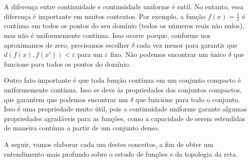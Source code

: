 \documentclass[Analysis/analysis_notes.tex]{subfiles}
\begin{document}
A diferença entre continuidade e continuidade uniforme é sutil. No entanto, essa diferença é importante em muitos contextos.
Por exemplo, a função $f(x) = \frac{1}{x}$ é contínua em todos os pontos do seu domínio (todos os números reais não nulos),
mas não é uniformemente contínua. Isso ocorre porque, conforme nos aproximamos de zero, precisamos escolher $\delta$ cada vez
menor para garantir que $d(f(x), f(x')) < \varepsilon$ para um $\varepsilon$ fixo. Não podemos encontrar um único $\delta$ que
funcione para todos os pontos do domínio.

Outro fato importante é que toda função contínua em um conjunto compacto é uniformemente contínua. Isso se deve às propriedades
dos conjuntos compactos, que garantem que podemos encontrar um $\delta$ que funcione para todo o conjunto. Isso é uma
propriedade muito útil, pois a continuidade uniforme garante algumas propriedades agradáveis para as funções, como a
capacidade de serem estendidas de maneira contínua a partir de um conjunto denso.

A seguir, vamos elaborar cada um destes conceitos, a fim de obter um entendimento mais profundo sobre o estudo de funções e da
topologia da reta.
\end{document}
